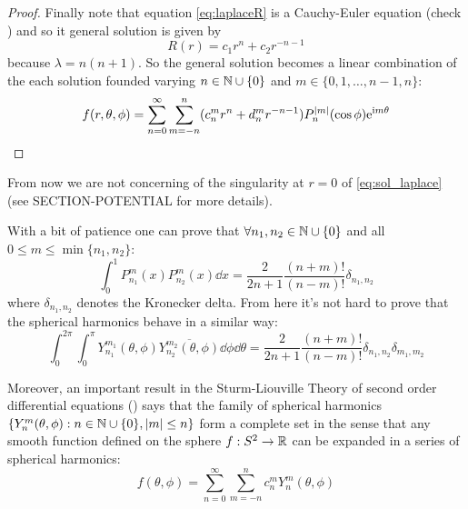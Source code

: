 \documentclass[../main.tex]{subfiles}
\begin{document}
\begin{proof}
  Finally note that equation \cref{eq:laplaceR} is a Cauchy-Euler equation (check \cite{wiki:cauchy-euler}) and so it general solution is given by
  \begin{equation}
    R(r) = c_1 r^{n} + c_2 r^{-n-1}
  \end{equation}
  because $\lambda = n(n+1)$. So the general solution becomes a linear combination of the each solution founded varying $n\in\mathbb{N}\cup\{0\}$ and $m\in\{0,1,\dots,n-1,n\}$:
  \begin{equation}
    f(r,\theta,\phi) = \sum_{n=0}^\infty \sum_{m=-n}^n (c_{n}^m r^{n} +d_n^mr^{-n-1})P_n^\abs{m}(\cos\phi) \mathrm{e}^{\mathrm{i} m\theta}
  \end{equation}
\end{proof}
From now we are not concerning of the singularity at $r=0$ of \cref{eq:sol_laplace} (see SECTION-POTENTIAL for more details).

With a bit of patience one can prove that $\forall n_1,n_2\in\mathbb{N}\cup\{0\}$ and all $0\leq m\leq\min\{n_1,n_2\}$:
\begin{equation}
  \int_0^1 P_{n_1}^{m}(x) P_{n_2}^{m}(x) \dd{x}=\frac{2}{2n+1}\frac{(n+m)!}{(n-m)!} \delta_{n_1,n_2}
\end{equation}
where $\delta_{n_1,n_2}$ denotes the Kronecker delta.
From here it's not hard to prove that the spherical harmonics behave in a similar way:
\begin{equation}
  \int_0^{2\pi}\int_0^\pi Y_{n_1}^{m_1}(\theta,\phi) \overline{Y_{n_2}^{m_2}(\theta,\phi)} \dd{\phi}\dd{\theta}=\frac{2}{2n+1}\frac{(n+m)!}{(n-m)!} \delta_{n_1,n_2}\delta_{m_1,m_2}
\end{equation}

Moreover, an important result in the Sturm-Liouville Theory of second order differential equations (\cite{wiki:sturm-liouville,completeness_SL}) says that the family of spherical harmonics $\{Y_n^m(\theta,\phi):n\in\mathbb{N}\cup\{0\},\abs{m}\leq n\}$ form a complete set in the sense that any smooth function defined on the sphere $f:S^2\rightarrow\mathbb{R}$ can be expanded in a series of spherical harmonics:
\begin{equation}
  f(\theta,\phi)=\sum_{n=0}^\infty\sum_{m=-n}^n c_{n}^m Y_n^m(\theta,\phi)
\end{equation}
\end{document}

